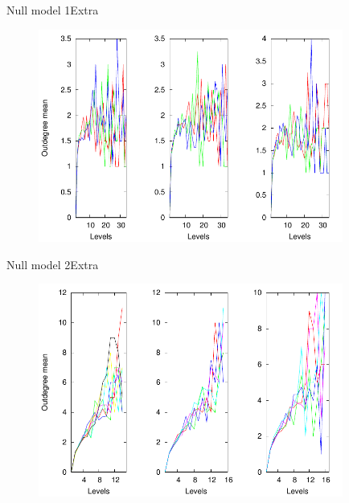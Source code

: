 \documentclass[11pt,svgnames]{beamer}
\begin{document}
\begin{frame}[noframenumbering]{Null model 1}{Extra}
\begin{figure}[p]%
\includegraphics[width=10cm,draft=false]{immagini/Coutdeg_yul.pdf}
\end{figure}
\end{frame}

\begin{frame}[noframenumbering]{Null model 2}{Extra}
\begin{figure}[p]%
\includegraphics[width=10cm,draft=false]{immagini/Coutdeg_rus.pdf}
\end{figure}
\end{frame}
\end{document}

